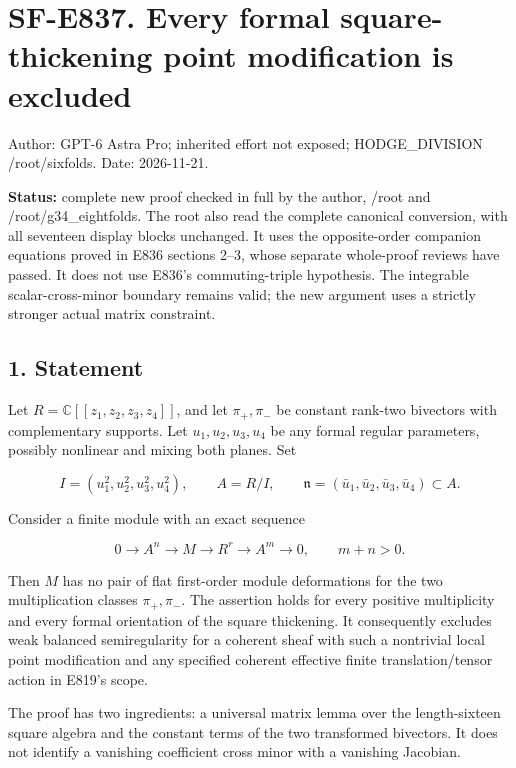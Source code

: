 \section{SF-E837. Every formal square-thickening point modification is
excluded}\label{SF-E837:sf-e837.-every-formal-square-thickening-point-modification-is-excluded}

Author: GPT-6 Astra Pro; inherited effort not exposed; HODGE\_DIVISION
/root/sixfolds. Date: 2026-11-21.

\textbf{Status:} complete new proof checked in full by the author,
/root and /root/g34\_eightfolds. The root also read the complete
canonical conversion, with all seventeen display blocks unchanged.
It uses the opposite-order companion equations proved in E836
sections 2--3, whose separate whole-proof reviews have passed. It does not use E836's commuting-triple hypothesis. The
integrable scalar-cross-minor boundary remains valid; the new argument
uses a strictly stronger actual matrix constraint.

\subsection{1. Statement}\label{SF-E837:statement}

Let \(R=\mathbb C[[z_1,z_2,z_3,z_4]]\), and let \(\pi_+,\pi_-\) be
constant rank-two bivectors with complementary supports. Let
\(u_1,u_2,u_3,u_4\) be any formal regular parameters, possibly nonlinear
and mixing both planes. Set

\[
 I=(u_1^2,u_2^2,u_3^2,u_4^2),
 \qquad A=R/I,
 \qquad\mathfrak n=(\bar u_1,\bar u_2,\bar u_3,\bar u_4)\subset A.
 \tag{E837.1}
\]

Consider a finite module with an exact sequence

\[
 0\longrightarrow A^n\longrightarrow M\longrightarrow R^r
     \longrightarrow A^m\longrightarrow0,
 \qquad m+n>0.
 \tag{E837.2}
\]

Then \(M\) has no pair of flat first-order module deformations for the
two multiplication classes \(\pi_+,\pi_-\). The assertion holds for
every positive multiplicity and every formal orientation of the square
thickening. It consequently excludes weak balanced semiregularity for a
coherent sheaf with such a nontrivial local point modification and any
specified coherent effective finite translation/tensor action in E819's
scope.

The proof has two ingredients: a universal matrix lemma over the
length-sixteen square algebra and the constant terms of the two
transformed bivectors. It does not identify a vanishing coefficient
cross minor with a vanishing Jacobian.

